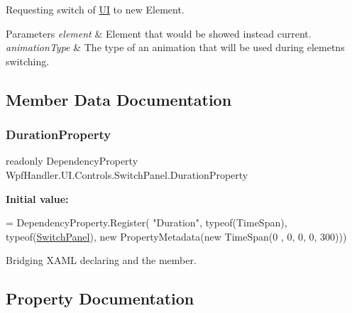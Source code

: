 Requesting switch of \mbox{\hyperlink{namespace_wpf_handler_1_1_u_i}{UI}} to new Element. 


\begin{DoxyParams}{Parameters}
{\em element} & Element that would be showed instead current.\\
\hline
{\em animation\+Type} & The type of an animation that will be used during elemetns switching.\\
\hline
\end{DoxyParams}


\subsection{Member Data Documentation}
\mbox{\label{class_wpf_handler_1_1_u_i_1_1_controls_1_1_switch_panel_ad636f8069ad5c1869073781451f6ba2a}} 
\subsubsection{\texorpdfstring{Duration\+Property}{DurationProperty}}
{\footnotesize\ttfamily readonly Dependency\+Property Wpf\+Handler.\+U\+I.\+Controls.\+Switch\+Panel.\+Duration\+Property\hspace{0.3cm}{\ttfamily [static]}}

{\bfseries Initial value\+:}
\begin{DoxyCode}
= DependencyProperty.Register(
          \textcolor{stringliteral}{"Duration"}, typeof(TimeSpan), typeof(\mbox{\hyperlink{class_wpf_handler_1_1_u_i_1_1_controls_1_1_switch_panel_a66b597d71d605434b2f51276feff9c8b}{SwitchPanel}}), \textcolor{keyword}{new} PropertyMetadata(\textcolor{keyword}{new} TimeSpan(0
      , 0, 0, 0, 300)))
\end{DoxyCode}


Bridging X\+A\+ML declaring and the member. 



\subsection{Property Documentation}
\mbox{\label{class_wpf_handler_1_1_u_i_1_1_controls_1_1_switch_panel_a5412b80c31880fe852a7b82c0a81fd7a}} 
